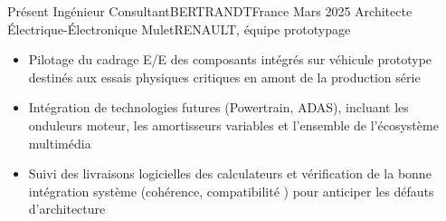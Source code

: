 %
%
%
\begin{experiences}
  \consultantexperience
    {Présent}   {Ingénieur Consultant}{BERTRANDT}{France}
    {Mars 2025} {Architecte Électrique-Électronique Mulet}{RENAULT, équipe prototypage}
                     { \begin{itemize}
                        \item Pilotage du cadrage E/E des composants intégrés sur véhicule prototype destinés aux essais physiques critiques en amont de la production série                        
                        \item Intégration de technologies futures (Powertrain, ADAS), incluant les onduleurs moteur, les amortisseurs variables et l'ensemble de l'écosystème multimédia                   
                        \item Suivi des livraisons logicielles des calculateurs et vérification de la bonne intégration système (cohérence, compatibilité ) pour anticiper les défauts d'architecture               
                                                                                       

\end{itemize}}
\end{experiences}
